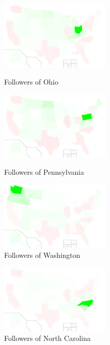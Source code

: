 \begin{figure}[t]
\begin{minipage}[b]{0.32\linewidth}
\centering
\includegraphics[width=53mm]{./images/oh.pdf}
\caption{Followers of Ohio}
\label{fig:state-oh}
\end{minipage}
\hspace{2mm}
\begin{minipage}[b]{0.32\linewidth}
\centering
\includegraphics[width=53mm]{./images/pa.pdf}
\caption{Followers of Pennsylvania}
\label{fig:state-pa}
\end{minipage}
\hspace{2mm}
\begin{minipage}[b]{0.32\linewidth}
\centering
\includegraphics[width=53mm]{./images/wa.pdf}
\caption{Followers of Washington}
\label{fig:state-wa}
\end{minipage}
\end{figure}

\begin{center}
\begin{figure}[t]
\begin{minipage}[b]{0.32\linewidth}
\centering
\includegraphics[width=53mm]{./images/nc.pdf}
\caption{Followers of North Carolina}
\label{fig:state-nc}
\end{minipage}
\end{figure}
\end{center}

